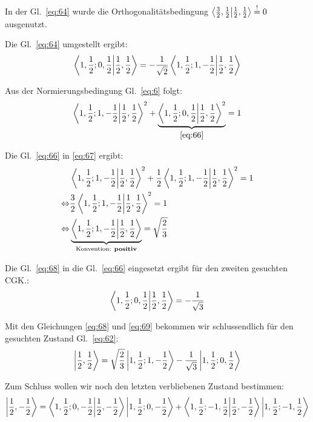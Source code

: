In der Gl.~\eqref{eq:64} wurde die Orthogonalitätsbedingung \(\braket{\frac 3
2,\frac 1 2}{\frac 1 2, \frac 1 2} \stackrel{!}=0\) ausgenutzt.

Die Gl.~\eqref{eq:64} umgestellt ergibt:
\begin{equation}
  \label{eq:66}
  \braket{1,\frac 1 2;0,\frac 1 2}{\frac 1 2,\frac 1 2}
  = -\frac 1 {\sqrt 2}\braket{1,\frac 1 2;1,-\frac 1 2}{\frac 1 2,\frac 1 2}
\end{equation}

Aus der Normierungsbedingung Gl.~\eqref{eq:6} folgt:
\begin{equation}
  \label{eq:67}
  \braket{1,\frac 1 2;1,-\frac 1 2}{\frac 1 2,\frac 1 2}^2+
  \underbrace{\braket{1,\frac 1 2;0,\frac 1 2}{\frac 1 2,\frac 1 2}^2}
  _{\eqref{eq:66}} =1
\end{equation}

Die Gl.~\eqref{eq:66} in \eqref{eq:67} ergibt:
\begin{align}
  \label{eq:68}
   &\braket{1,\frac 1 2;1,-\frac 1 2}{\frac 1 2,\frac 1 2}^2
   +\frac 1 2 \braket{1,\frac 1 2;1,-\frac 1 2}{\frac 1 2,\frac 1 2}^2=1
   \notag\\
   \Leftrightarrow 
   &\frac 3 2 \braket{1,\frac 1 2;1,-\frac 1 2}{\frac 1 2,\frac 1 2}^2=1
   \notag\\
   \Leftrightarrow&\underbrace{ 
    \braket{1,\frac 1 2;1,-\frac 1 2}{\frac 1 2,\frac 1 2}}
  _{\text{Konvention: \textbf{positiv}}}=\sqrt{\frac 2 3}
\end{align}

Die Gl.~\eqref{eq:68} in die Gl.~\eqref{eq:66} eingesetzt ergibt für den zweiten
gesuchten CGK.:
\begin{equation}
  \label{eq:69}
  \braket{1,\frac 1 2;0,\frac 1 2}{\frac 1 2,\frac 1 2}=-\frac 1 {\sqrt 3}
\end{equation}

Mit den Gleichungen \eqref{eq:68} und \eqref{eq:69} bekommen wir schlussendlich
für den gesuchten Zustand Gl.~\eqref{eq:62}:
\begin{equation}
  \label{eq:70}
    \left| \frac 1 2, \frac 1 2 \right\rangle=\sqrt{\frac 2 3}\left| 1,\frac 1 2;1,-\frac 1 2 \right\rangle
   -\frac 1 {\sqrt 3}\left| 1,\frac 1 2;0,\frac 1 2 \right\rangle
\end{equation}

Zum Schluss wollen wir noch den letzten verbliebenen Zustand bestimmen:
\begin{equation}
  \label{eq:71}
  \ket{\frac 1 2,-\frac 1 2}=\braket{1,\frac 1 2;0,-\frac 1 2}
  {\frac 1 2,-\frac 1 2 }\ket{1,\frac 1 2;0,-\frac 1 2} + \braket{1,\frac 1 2;-1,\frac 1 2}
  {\frac 1 2, -\frac 1 2 }\ket{1,\frac 1 2;-1,\frac 1 2}
\end{equation}

